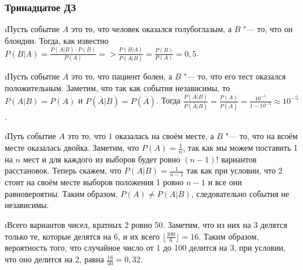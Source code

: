 \subsubsection{Тринадцатое ДЗ}


\i Пусть событие $A$ это то, что человек оказался голубоглазым, а $B$ "--- то, что он блондин. Тогда, как известно $P(B|A) = \frac{P(A|B)\cdot P(B)}{P(A)} => \frac{P(B|A)}{P(A|B)} = \frac{P(B)}{P(A)} = 0{,}5$.

\i Пусть событие $A$ это то, что пациент болен, а $B$ "--- то, что его тест оказался положительным. Заметим, что так как события независимы, то $P(A|B) = P(A)$ и $P(\overline{A}|B) = P(\overline{A})$. Тогда $\frac{P(A|B)}{P(\overline{A}|B)} = \frac{P(A)}{P(\overline{A})} = \frac{10^{-5}}{1-10^{-5}} \approx 10^{-5}$.

\i Путь событие $A$ это то, что 1 оказалась на своём месте, а $B$ "--- то, что на всоём месте оказалась двойка. Заметим, что $P(A) = \frac{1}{n}$, так как мы можем поставить 1 на $n$ мест и для каждого из выборов будет ровно $(n-1)!$ вариантов расстановок. Теперь скажем, что $P(A|B) = \frac{1}{n-1}$ так как при условии, что 2 стоит на своём месте выборов положения 1 ровно $n-1$ и все они равновероятны. Таким образом, $P(A) \ne P(A|B)$, следовательно события не независимы.

\i Всего вариантов чисел, кратных 2 ровно 50. Заметим, что из них на 3 делятся только те, которые делятся на 6, и их всего $\lfloor\frac{100}{6}\rfloor = 16$. Таким образом, вероятность того, что случайное число от 1 до 100 делится на 3, при условии, что оно делится на 2, равна $\frac{16}{50} = 0{,}32$.

